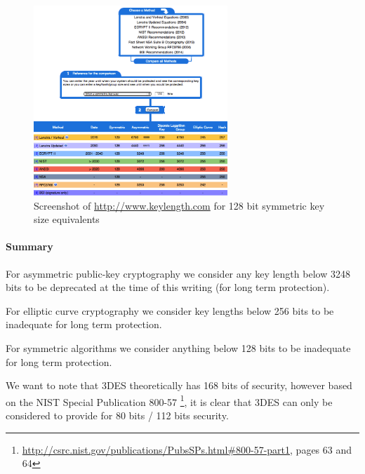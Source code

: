 \begin{figure}[h]
  \centering
  \includegraphics[width=0.65\textwidth]{img/keylengths_com.png}
  \caption{Screenshot of \url{http://www.keylength.com} for 128 bit symmetric key size equivalents}
  \label{fig:keylengths.com}
\end{figure}


\paragraph{Summary}
\begin{itemize*}
  \item For asymmetric public-key cryptography we consider any key length below
3248 bits to be deprecated at the time of this writing (for long term
protection).
  \item For elliptic curve cryptography we consider key lengths below 256 bits to
be inadequate for long term protection.  
  \item For symmetric algorithms we consider anything below 128 bits to be
inadequate for long term protection.
\end{itemize*}

We want to note that 3DES theoretically has 168 bits of security, however based
on the NIST Special Publication 800-57
\footnote{\url{http://csrc.nist.gov/publications/PubsSPs.html\#800-57-part1},
pages 63 and 64}, it is clear that 3DES can only be considered to provide for
80 bits / 112 bits security.

